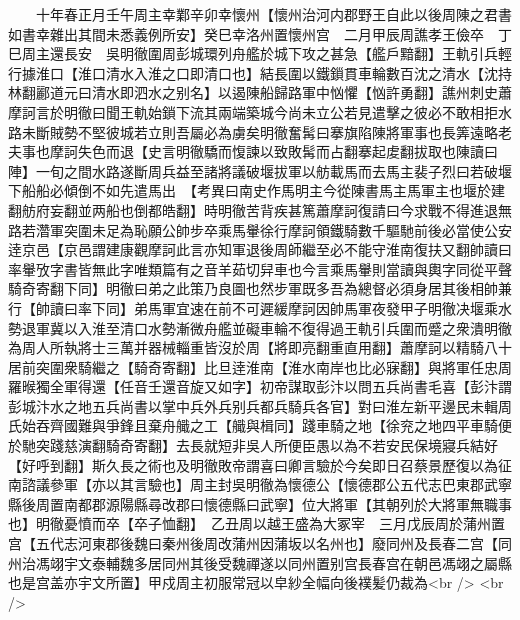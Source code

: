 　　十年春正月壬午周主幸鄴辛卯幸懷州【懷州治河内郡野王自此以後周陳之君書如書幸雜出其間未悉義例所安】癸巳幸洛州置懷州宫　二月甲辰周譙孝王儉卒　丁巳周主還長安　吳明徹圍周彭城環列舟艦於城下攻之甚急【艦戶黯翻】王軌引兵輕行據淮口【淮口清水入淮之口即清口也】結長圍以鐵鎻貫車輪數百沈之清水【沈持林翻酈道元曰清水即泗水之别名】以遏陳船歸路軍中忷懼【忷許勇翻】譙州刺史蕭摩訶言於明徹曰聞王軌始鎖下流其兩端築城今尚未立公若見遣擊之彼必不敢相拒水路未斷賊勢不堅彼城若立則吾屬必為虜矣明徹奮髯曰搴旗陷陳將軍事也長筭遠略老夫事也摩訶失色而退【史言明徹驕而愎諫以致敗髯而占翻搴起䖍翻拔取也陳讀曰陣】一旬之間水路遂斷周兵益至諸將議破堰拔軍以舫載馬而去馬主裴子烈曰若破堰下船船必傾倒不如先遣馬出　【考異曰南史作馬明主今從陳書馬主馬軍主也堰於建翻舫府妄翻並两船也倒都皓翻】時明徹苦背疾甚篤蕭摩訶復請曰今求戰不得進退無路若濳軍突圍未足為恥願公帥步卒乘馬轝徐行摩訶領鐵騎數千驅馳前後必當使公安逹京邑【京邑謂建康觀摩訶此言亦知軍退後周師繼至必不能守淮南復扶又翻帥讀曰率轝攷字書皆無此字唯類篇有之音羊茹切舁車也今言乘馬轝則當讀與輿字同從平聲騎奇寄翻下同】明徹曰弟之此策乃良圖也然步軍既多吾為總督必須身居其後相帥兼行【帥讀曰率下同】弟馬軍宜速在前不可遲緩摩訶因帥馬軍夜發甲子明徹决堰乘水勢退軍冀以入淮至清口水勢漸微舟艦並礙車輪不復得過王軌引兵圍而蹙之衆潰明徹為周人所執將士三萬并器械輜重皆沒於周【將即亮翻重直用翻】蕭摩訶以精騎八十居前突圍衆騎繼之【騎奇寄翻】比旦逹淮南【淮水南岸也比必寐翻】與將軍任忠周羅㬋獨全軍得還【任音壬還音旋又如字】初帝謀取彭汴以問五兵尚書毛喜【彭汴謂彭城汴水之地五兵尚書以掌中兵外兵别兵都兵騎兵各官】對曰淮左新平邊民未輯周氏始吞齊國難與爭鋒且棄舟艥之工【艥與楫同】踐車騎之地【徐兖之地四平車騎便於馳突踐慈演翻騎奇寄翻】去長就短非吳人所便臣愚以為不若安民保境寢兵結好【好呼到翻】斯久長之術也及明徹敗帝謂喜曰卿言驗於今矣即日召蔡景歷復以為征南諮議參軍【亦以其言驗也】周主封吳明徹為懷德公【懷德郡公五代志巴東郡武寧縣後周置南都郡源陽縣尋改郡曰懷德縣曰武寧】位大將軍【其朝列於大將軍無職事也】明徹憂憤而卒【卒子恤翻】　乙丑周以越王盛為大冢宰　三月戊辰周於蒲州置宫【五代志河東郡後魏曰秦州後周改蒲州因蒲坂以名州也】廢同州及長春二宫【同州治馮翊宇文泰輔魏多居同州其後受魏禪遂以同州置别宫長春宫在朝邑馮翊之屬縣也是宫盖亦宇文所置】甲戍周主初服常冠以皁紗全幅向後襆髪仍裁為<br />
<br />
